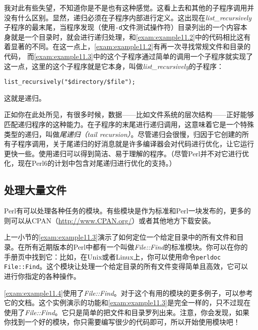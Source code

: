 我对此有些失望，不知道你是不是也有这种感觉。这看上去和其他的子程序调用并没有什么区别。显然，递归必须在子程序内部进行定义。这出现在\textit{list\_recursively}子程序的最末尾，当程序发现（使用\verb|-d|文件测试操作符）目录列出的一个内容本身就是一个目录时，就会进行递归处理，和\autoref{exam:example11.2}中的代码相比这有着显著的不同。在这一点上，\autoref{exam:example11.2}有再一次寻找常规文件和目录的代码，
而\autoref{exam:example11.3}中的这个子程序通过简单的调用一个子程序就实现了这一点，这里的这个子程序就是它本身，叫做\textit{list\_recursively}的子程序：

\begin{lstlisting}
list_recursively("$directory/$file");
\end{lstlisting}

这就是递归。

正如你在此处所见，有很多时候，数据——比如文件系统的层次结构——正好能够匹配递归程序的这种能力。在子程序的末尾进行递归调用，这意味着它是一个特殊类型的递归，叫做\textit{尾递归（tail
recursion）}。尽管递归会很慢，归因于它创建的所有子程序调用，关于尾递归的好消息就是许多编译器会对代码进行优化，让它运行更快一些。使用递归可以得到简洁、易于理解的程序。（尽管Perl并不对它进行优化，现在Perl6的计划中包含对尾递归进行优化的支持。）

\subsection{处理大量文件}
\label{sect:section11.2.3}
Perl有可以处理各种任务的模块。有些模块是作为标准和Perl一块发布的，更多的则可以从CPAN（\href{http://www.CPAN.org/}{http://www.CPAN.org/}）或者其他地方下载安装。

上一小节的\autoref{exam:example11.3}演示了如何定位一个给定目录中的所有文件和目录。在所有近期版本的Perl中都有一个叫做\textit{File::Find}的标准模块。你可以在你的手册页中找到它：比如，在Unix或者Linux上，你可以使用命令\verb|perldoc File::Find|。这个模块让处理一个给定目录的所有文件变得简单且高效，它可以进行你指定的各种操作。

\autoref{exam:example11.4}使用了\textit{File::Find}。对于这个有用的模块的更多例子，可以参考它的文档。这个实例演示的功能和\autoref{exam:example11.3}是完全一样的，只不过现在使用了\textit{File::Find}。它只是简单的把文件和目录罗列出来。注意，你会发现，如果你找到一个好的模块，你只需要编写很少的代码即可，所以开始使用模块吧！




